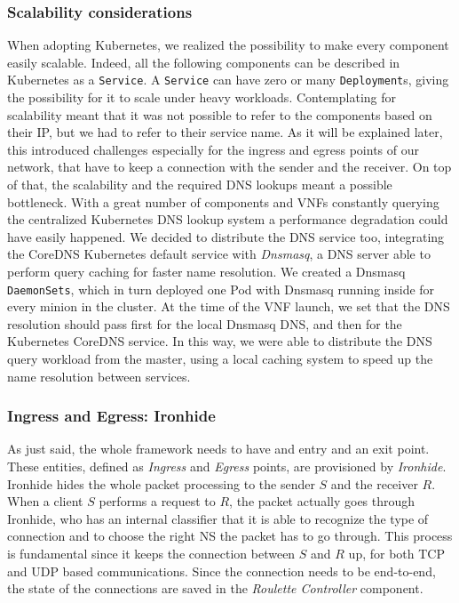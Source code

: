 \subsubsection{Scalability considerations}
\label{chap:archimple:sec:secondattempt:sub:scalability}
When adopting Kubernetes, we realized the possibility to make every component
easily scalable. Indeed, all the following components can be described in
Kubernetes as a \verb!Service!. A \verb!Service! can have zero or many
\verb!Deployment!s, giving the possibility for it to scale under heavy
workloads. Contemplating for scalability meant that it was not possible to refer
to the components based on their IP, but we had to refer to their service name.
As it will be explained later, this introduced challenges especially for the
ingress and egress points of our network, that have to keep a connection with
the sender and the receiver. On top of that, the scalability and the required
DNS lookups meant a possible bottleneck. With a great number of components and
VNFs constantly querying the centralized Kubernetes DNS lookup system a
performance degradation could have easily happened. We decided to distribute the
DNS service too, integrating the CoreDNS Kubernetes default service with
\emph{Dnsmasq}, a DNS server able to perform query caching for faster name
resolution. We created a Dnsmasq \verb!DaemonSets!, which in turn deployed one
Pod with Dnsmasq running inside for every minion in the cluster. At the time of
the VNF launch, we set that the DNS resolution should pass first for the local
Dnsmasq DNS, and then for the Kubernetes CoreDNS service. In this way, we were
able to distribute the DNS query workload from the master, using a local caching
system to speed up the name resolution between services.

\subsubsection{Ingress and Egress: Ironhide}
As just said, the whole framework needs to have and entry and an exit point.
These entities, defined as \emph{Ingress} and \emph{Egress} points, are
provisioned by \emph{Ironhide}. Ironhide hides the whole packet processing to
the sender $S$ and the receiver $R$. When a client $S$ performs a request to
$R$, the packet actually goes through Ironhide, who has an internal classifier
that it is able to recognize the type of connection and to choose the right NS
the packet has to go through. This process is fundamental since it keeps the
connection between $S$ and $R$ up, for both TCP and UDP based communications.
Since the connection needs to be end-to-end, the state of the connections are
saved in the \emph{Roulette Controller} component.

